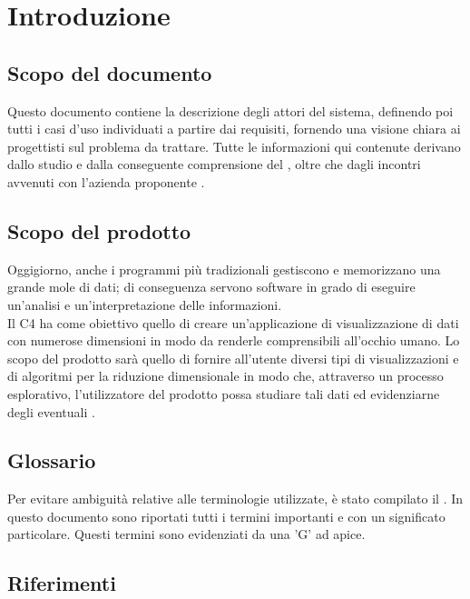 \section{Introduzione}
\subsection{Scopo del documento}
Questo documento contiene la descrizione degli attori del sistema, definendo poi tutti i casi d'uso individuati a partire dai requisiti, fornendo una visione chiara ai progettisti sul problema da trattare. Tutte le informazioni qui contenute derivano dallo studio e dalla conseguente comprensione del , oltre che dagli incontri avvenuti con l'azienda proponente \Proponente{}.
\subsection{Scopo del prodotto}
Oggigiorno, anche i programmi più tradizionali gestiscono e memorizzano una grande mole di dati; di conseguenza servono software in grado di eseguire un'analisi e un'interpretazione delle informazioni.\\
Il  C4 ha come obiettivo quello di creare un'applicazione di visualizzazione di dati con numerose dimensioni in modo da renderle comprensibili all'occhio umano.  Lo scopo del prodotto sarà quello di fornire all'utente diversi tipi di visualizzazioni e di algoritmi per la riduzione dimensionale in modo che, attraverso un processo esplorativo, l'utilizzatore del prodotto possa studiare tali dati ed evidenziarne degli eventuali . 
\subsection{Glossario}
Per evitare ambiguità relative alle terminologie utilizzate, è stato compilato il . In questo documento sono riportati tutti i termini importanti e con un significato particolare. Questi termini sono evidenziati da una 'G' ad apice.
\subsection{Riferimenti}

